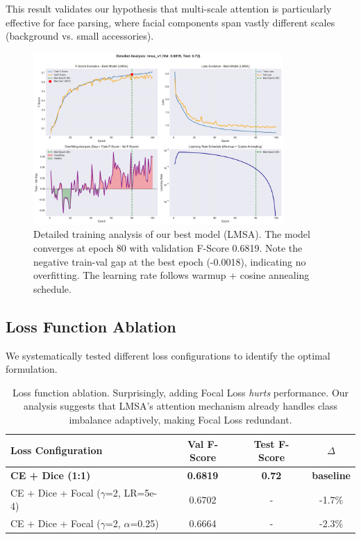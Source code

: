 This result validates our hypothesis that multi-scale attention is particularly effective for face parsing, where facial components span vastly different scales (background vs. small accessories).

\begin{figure}[h]
\centering
\includegraphics[width=0.85\textwidth]{figures/best_model_analysis.pdf}
\caption{Detailed training analysis of our best model (LMSA). The model converges at epoch 80 with validation F-Score 0.6819. Note the negative train-val gap at the best epoch (-0.0018), indicating no overfitting. The learning rate follows warmup + cosine annealing schedule.}
\label{fig:best_model_analysis}
\end{figure}

\subsection{Loss Function Ablation}

We systematically tested different loss configurations to identify the optimal formulation.

\begin{table}[h]
\centering
\small
\begin{tabular}{lccc}
\hline
Loss Configuration & Val F-Score & Test F-Score & $\Delta$ \\
\hline
\textbf{CE + Dice (1:1)} & \textbf{0.6819} & \textbf{0.72} & \textbf{baseline} \\
CE + Dice + Focal ($\gamma$=2, LR=5e-4) & 0.6702 & - & -1.7\% \\
CE + Dice + Focal ($\gamma$=2, $\alpha$=0.25) & 0.6664 & - & -2.3\% \\
\hline
\end{tabular}
\caption{Loss function ablation. Surprisingly, adding Focal Loss \textit{hurts} performance. Our analysis suggests that LMSA's attention mechanism already handles class imbalance adaptively, making Focal Loss redundant.}
\end{table}

